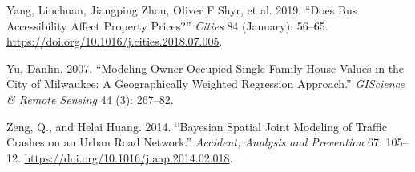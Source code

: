 \documentclass[
  default,
]{sn-jnl}
\newlength{\cslhangindent}
\newenvironment{CSLReferences}[2] %
 {\begin{list}{}{%
  \setlength{\itemindent}{0pt}
  \setlength{\leftmargin}{0pt}
  \setlength{\parsep}{0pt}
  \ifodd #1
   \setlength{\leftmargin}{\cslhangindent}
   \setlength{\itemindent}{-1\cslhangindent}
  \fi
  \setlength{\itemsep}{#2\baselineskip}}}
 {\end{list}}
\begin{document}
\begin{CSLReferences}{1}{0}
Yang, Linchuan, Jiangping Zhou, Oliver F Shyr, et al. 2019. {``Does Bus
Accessibility Affect Property Prices?''} \emph{Cities} 84 (January):
56--65. \url{https://doi.org/10.1016/j.cities.2018.07.005}.

Yu, Danlin. 2007. {``Modeling Owner-Occupied Single-Family House Values
in the City of Milwaukee: A Geographically Weighted Regression
Approach.''} \emph{GIScience \& Remote Sensing} 44 (3): 267--82.

Zeng, Q., and Helai Huang. 2014. {``Bayesian Spatial Joint Modeling of
Traffic Crashes on an Urban Road Network.''} \emph{Accident; Analysis
and Prevention} 67: 105--12.
\url{https://doi.org/10.1016/j.aap.2014.02.018}.

\end{CSLReferences}
\end{document}
